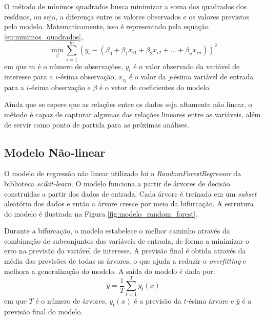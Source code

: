 O método de mínimos quadrados busca minimizar a soma dos quadrados dos resíduos, ou seja, a diferença entre os valores
observados e os valores previstos pelo modelo. Matematicamente, isso é representado pela equação \ref{eq:minimos_quadrados},
\begin{equation}
\label{eq:minimos_quadrados}
\min_{\beta} \sum_{i=1}^{m} \left(y_i - (\beta_0 + \beta_1 x_{i1} + \beta_2 x_{i2} + ... + \beta_n x_{in})\right)^2
\end{equation}
em que $m$ é o número de observações, $y_i$ é o valor observado da variável de interesse para a $i$-ésima observação,
$x_{ij}$ é o valor da $j$-ésima variável de entrada para a $i$-ésima observação e $\beta$ é o vetor de coeficientes
do modelo.

Ainda que se espere que as relações entre os dados seja altamente não linear, o método é capaz de capturar algumas
das relações lineares entre as variáveis, além de servir como ponto de partida para as próximas análises.


\subsection{Modelo Não-linear}
O modelo de regressão não linear utilizado foi o \textit{RandomForestRegressor} da biblioteca \textit{scikit-learn}. O modelo 
funciona a partir de árvores de decisão construídas a partir dos dados de entrada. Cada árvore é treinada em um \textit{subset}
aleatório dos dados e então a árvore cresce por meio da bifurcação. A estrutura do modelo é ilustrada na Figura
\ref{fig:modelo_random_forest}.

\begin{figure}[!ht]
	{}
	{}
\end{figure}
Durante a bifurcação, o modelo estabelece o melhor caminho através da combinação de subconjuntos das variáveis de entrada, 
de forma a minimizar o erro na previsão da variável de interesse. A previsão final é obtida através da média das previsões 
de todas as árvores, o que ajuda a reduzir o \textit{overfitting} e melhora a generalização do modelo. A saída do modelo
é dada por:
\begin{equation}
\label{eq:regressao_random_forest}
\hat{y} = \frac{1}{T} \sum_{t=1}^{T} y_t(x)
\end{equation}
em que $T$ é o número de árvores, $y_t(x)$ é a previsão da $t$-ésima árvore e $\hat{y}$ é a previsão final do modelo.


